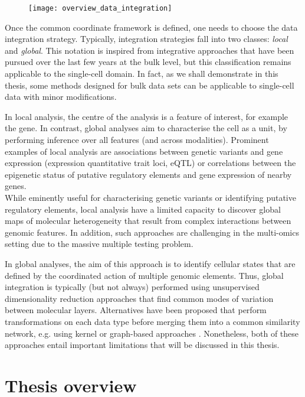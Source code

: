 \begin{figure}[H]
	\centering
	\texttt{[image: overview\_data\_integration]}
	\caption{}
	\label{fig:overview_data_integration}
\end{figure}

Once the common coordinate framework is defined, one needs to choose the data integration strategy. Typically, integration strategies fall into two classes: \textit{local} and \textit{global}. This notation is inspired from integrative approaches that have been pursued over the last few years at the bulk level\cite{Ritchie2015}, but this classification remains applicable to the single-cell domain. In fact, as we shall demonstrate in this thesis, some methods designed for bulk data sets can be applicable to single-cell data with minor modifications.

In local analysis, the centre of the analysis is a feature of interest, for example the gene. In contrast, global analyses aim to characterise the cell as a unit, by performing inference over all features (and across modalities). Prominent examples of local analysis are associations between genetic variants and gene expression (expression quantitative trait loci, eQTL) or correlations between the epigenetic status of putative regulatory elements and gene expression of nearby genes.\\
While eminently useful for characterising genetic variants or identifying putative regulatory elements, local analysis have a limited capacity to discover global maps of molecular heterogeneity that result from complex interactions between genomic features. In addition, such approaches are challenging in the multi-omics setting due to the massive multiple testing problem.

In global analyses, the aim of this approach is to identify cellular states that are defined by the coordinated action of multiple genomic elements. Thus, global integration is typically (but not always) performed using unsupervised dimensionality reduction approaches that find common modes of variation between molecular layers. Alternatives have been proposed that perform transformations on each data type before merging them into a common similarity network, e.g. using kernel or graph-based approaches \cite{Lanckriet2004, Wang2014}. Nonetheless, both of these approaches entail important limitations that will be discussed in this thesis.

\section{Thesis overview}

